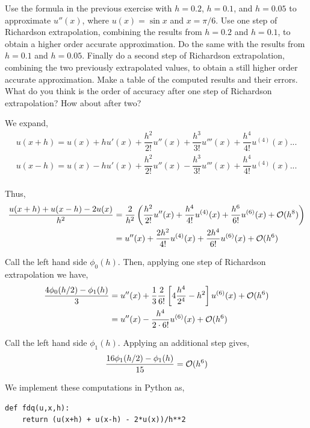\documentclass[10pt]{article}
\begin{document}
\begin{problem}[Problem 2]
Use the formula in the previous exercise with \(h=0.2\), \(h=0.1\), and \(h=0.05\) to approximate \(u'' (x)\), where \(u(x) = \sin x\) and \(x = \pi / 6\).  Use one step of Richardson extrapolation, combining the results from \(h=0.2\) and \(h=0.1\), to obtain a higher order accurate approximation.  Do the same with the results from \(h=0.1\) and \(h=0.05\).  Finally do a second step of Richardson extrapolation, combining the two previously extrapolated values, to obtain a still higher order accurate approximation.  Make a table of the computed results and their errors.  What do you think is the order of accuracy after one step of Richardson extrapolation?  How about after two?
\end{problem}

\begin{solution}[Solution]
We expand,
\begin{align*}
    u(x+h) = u(x) + h u'(x) + \dfrac{h^2}{2!}u''(x) + \dfrac{h^3}{3!}u'''(x) + \dfrac{h^4}{4!}u^{(4)}(x) ... \\
    u(x-h) = u(x) - h u'(x) + \dfrac{h^2}{2!}u''(x) - \dfrac{h^3}{3!}u'''(x) + \dfrac{h^4}{4!}u^{(4)}(x) ... \\
\end{align*}

Thus,
\begin{align*}
    \dfrac{u(x+h)+u(x-h)-2u(x)}{h^2} &= \dfrac{2}{h^2}\left(\dfrac{h^2}{2!} u''(x) + \dfrac{h^4}{4!} u^{(4)}(x) + \dfrac{h^6}{6!}u^{(6)}(x) + \mathcal{O}(h^8) \right) \\
    &= u''(x) + \dfrac{2h^2}{4!}u^{(4)}(x) + \dfrac{2h^4}{6!}u^{(6)}(x) + \mathcal{O}(h^6)
\end{align*}

Call the left hand side \( \phi_0(h) \). Then, applying one step of Richardson extrapolation we have,
\begin{align*}
    \dfrac{4\phi_0(h/2)-\phi_1(h)}{3} &= u''(x) + \dfrac{1}{3}\dfrac{2}{6!}\left[4\dfrac{h^4}{2^4}-h^2\right] u^{(6)}(x) + \mathcal{O}(h^6) \\
    &= u''(x) - \dfrac{h^4}{2\cdot 6!} u^{(6)}(x) + \mathcal{O}(h^6)
\end{align*}

    Call the left hand side \( \phi_1(h) \). Applying an additional step gives,
\begin{align*}
    \dfrac{16\phi_1(h/2)-\phi_1(h)}{15} = \mathcal{O}(h^6)
\end{align*}

We implement these computations in Python as,
\begin{lstlisting}
def fdq(u,x,h):
    return (u(x+h) + u(x-h) - 2*u(x))/h**2


\end{lstlisting}
\end{solution}
\end{document}
